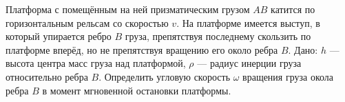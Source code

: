 Платформа с помещённым на ней призматическим грузом $AB$ катится
по горизонтальным рельсам со скоростью $v$.
На платформе имеется выступ, в который упирается ребро $B$ груза,
препятствуя последнему скользить по платформе вперёд,
но не препятствуя вращению его около ребра $B$.
Дано: $h$ --- высота центра масс груза над платформой,
$\rho$ --- радиус инерции груза относительно ребра $B$.
Определить угловую скорость $\omega$ вращения груза окола ребра $B$
в момент мгновенной остановки платформы.
